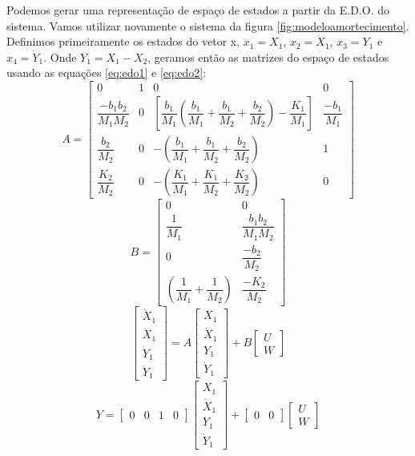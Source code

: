 Podemos gerar uma representação de espaço de estados a partir da E.D.O. do sistema. Vamos utilizar novamente o sistema da figura \ref{fig:modeloamortecimento}. Definimos primeiramente os estados do vetor x, $x_1=X_1$, $x_2=\dot{X}_1$, $x_3=Y_1$ e $x_4=\dot{Y}_1$. Onde $Y_1=X_1-X_2$, geramos então as matrizes do espaço de estados usando as equações \eqref{eq:edo1} e \eqref{eq:edo2}:
\begin{equation}
A=\begin{bmatrix}
0 & 1 & 0 & 0\\
\dfrac{-b_1b_2}{M_1M_2} & 0 &\left[ \dfrac {b_1} {M_1} \left( \dfrac {b_1} {M_1} + \dfrac{b_1}{M_2} +\dfrac{b_2}{M_2} \right)- \dfrac{K_1}{M_1}\right] & \dfrac{-b_1}{M_1}\\
\dfrac{b_2}{M_2} & 0 & -\left( \dfrac{b_1}{M_1}+ \dfrac{b_1}{M_2}+ \dfrac{b_2}{M_2} \right) & 1\\
\dfrac{K_2}{M_2} & 0 & -\left( \dfrac{K_1}{M_1} +\dfrac{K_1}{M_2}+ \dfrac{K_2}{M_2} \right) & 0
\end{bmatrix}
\end{equation}
\begin{equation}
B=\begin{bmatrix}
0 & 0 \\
\dfrac{1}{M_1} & \dfrac{b_1b_2}{M_1M_2}\\
0 & \dfrac{-b_2}{M_2} \\
\left( \dfrac{1}{M_1}+ \dfrac{1}{M_2} \right) & \dfrac{-K_2}{M_2}
\end{bmatrix}
\end{equation}
\begin{equation}
\begin{bmatrix}
\dot{X}_1\\
\ddot{X}_1\\
\dot{Y}_1\\
\ddot{Y}_1
\end{bmatrix}
=
A
\begin{bmatrix}
X_1\\\dot{X}_1 \\Y_1 \\ \dot{Y}_1
\end{bmatrix}
+
B
\begin{bmatrix}
U\\W
\end{bmatrix}
\end{equation}
\begin{equation}
Y=
\begin{bmatrix}
0 & 0 & 1 & 0
\end{bmatrix}
\begin{bmatrix}
X_1\\\dot{X}_1\\Y_1\\\dot{Y}_1
\end{bmatrix}
+
\begin{bmatrix}
0 & 0
\end{bmatrix}
\begin{bmatrix}
U \\W
\end{bmatrix}
\end{equation}

